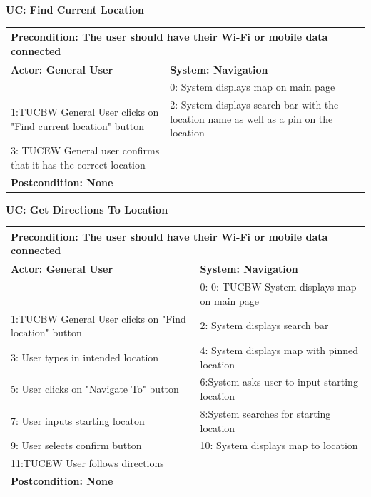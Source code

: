 \documentclass{article}
\begin{document}
	{
\noindent\textbf{UC: Find Current Location}
\begin{flushleft}
\begin{tabular}{ |p{7cm}|p{7cm}| } 
   \hline
  \multicolumn{2}{|p{\textwidth}|}{\textbf{Precondition:} The user should have their Wi-Fi or mobile data connected} \\
  \hline
\textbf {Actor: General User} & \textbf{System: Navigation}\\ 
\hline
 & 0: System displays map on main page\\ 
\hline
 1:TUCBW General User clicks on "Find current location" button & 2: System displays search bar with the location name as well as a pin on the location \\ 
\hline
3: TUCEW General user confirms that it has the correct location & \\
  \hline
  \multicolumn{2}{|p{\textwidth}|}{\textbf{Postcondition: None}} \\
   \hline

\end{tabular}

\end{flushleft}

\noindent\textbf{UC: Get Directions To Location}
\begin{flushleft}
\begin{tabular}{  |p{7cm}|p{7cm}| } 
  \hline
  \multicolumn{2}{|p{\textwidth}|}{\textbf{Precondition:} The user should have their Wi-Fi or mobile data connected} \\
  \hline
 \textbf {Actor: General User} & \textbf{System: Navigation}\\ 
\hline 
 & 0: 0: TUCBW System displays map on main page\\ 
\hline
 1:TUCBW General User clicks on "Find location" button & 2: System displays search bar \\ 
\hline
3: User types in intended location & 4: System displays map with pinned location \\
 \hline
5: User clicks on "Navigate To" button & 6:System asks user to input starting location \\
 \hline
7: User inputs starting locaton & 8:System searches for starting location \\
 \hline
9: User selects confirm button & 10: System displays map to location \\
 \hline
11:TUCEW  User follows directions &  \\
  \hline
  \multicolumn{2}{|p{\textwidth}|}{\textbf{Postcondition: None}} \\
   \hline


\end{tabular}
\end{flushleft}}
\end{document}

